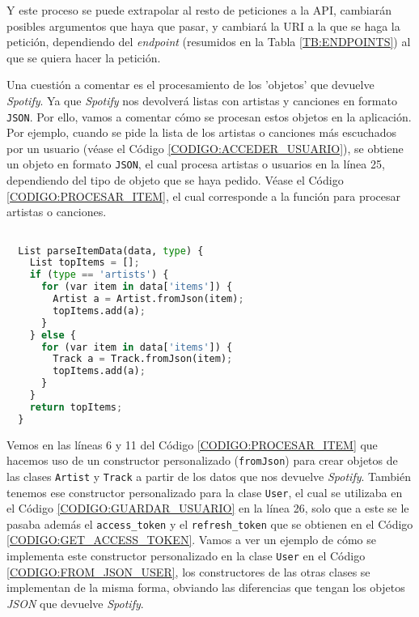 Y este proceso se puede extrapolar al resto de peticiones a la API, cambiarán posibles argumentos que haya que pasar, y cambiará la URI a la que se haga la petición,
dependiendo del \textit{endpoint} (resumidos en la Tabla \ref{TB:ENDPOINTS}) al que se quiera hacer la petición.

Una cuestión a comentar es el procesamiento de los 'objetos' que devuelve \textit{Spotify}. Ya que \textit{Spotify} nos devolverá listas con 
artistas y canciones en formato \texttt{JSON}. Por ello, vamos a comentar cómo se procesan estos objetos en la aplicación. Por ejemplo, cuando 
se pide la lista de los artistas o canciones más escuchados por un usuario (véase el Código \ref{CODIGO:ACCEDER_USUARIO}), se obtiene un objeto en formato \texttt{JSON}, el cual procesa 
artistas o usuarios en la línea 25, dependiendo del tipo de objeto que se haya pedido. Véase el Código \ref{CODIGO:PROCESAR_ITEM}, el cual corresponde
a la función para procesar artistas o canciones.

\begin{lstlisting}[language=python, caption=Procesar objeto en formato \textit{JSON}, label=CODIGO:PROCESAR_ITEM]

  List parseItemData(data, type) {
    List topItems = [];
    if (type == 'artists') {
      for (var item in data['items']) {
        Artist a = Artist.fromJson(item);
        topItems.add(a);
      }
    } else {
      for (var item in data['items']) {
        Track a = Track.fromJson(item);
        topItems.add(a);
      }
    }
    return topItems;
  }

\end{lstlisting}

Vemos en las líneas 6 y 11 del Código \ref{CODIGO:PROCESAR_ITEM} que hacemos uso de un constructor personalizado (\texttt{fromJson}) 
para crear objetos de las clases \texttt{Artist} y \texttt{Track} a partir de los datos que nos devuelve \textit{Spotify}. También tenemos 
ese constructor personalizado para la clase \texttt{User}, el cual se utilizaba en el Código \ref{CODIGO:GUARDAR_USUARIO} en la línea 26, solo
que a este se le pasaba además el \texttt{access\_token} y el \texttt{refresh\_token} que se obtienen en el Código \ref{CODIGO:GET_ACCESS_TOKEN}.
Vamos a ver un ejemplo de cómo se implementa este constructor personalizado en la clase \texttt{User} en el Código \ref{CODIGO:FROM_JSON_USER}, los 
constructores de las otras clases se implementan de la misma forma, obviando las diferencias que tengan los objetos \textit{JSON} que devuelve \textit{Spotify}.

